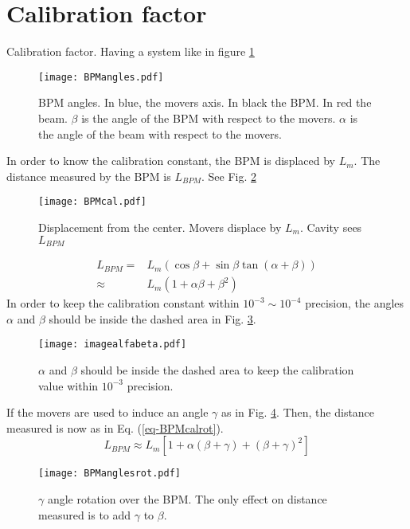 \section{Calibration factor}
Calibration factor. Having a system like in figure \ref{f-BPMangles}
\begin{figure}[htb]
 \begin{center}
  \texttt{[image: BPMangles.pdf]}\caption{BPM angles. In blue, the movers axis. In black the BPM. In red the beam. $\beta$ is the angle of the BPM with respect to the movers. $\alpha$ is the angle of the beam with respect to the movers.}\label{f-BPMangles}
 \end{center}
\end{figure}
In order to know the calibration constant, the BPM is displaced by $L_m$. The distance measured by the BPM is $L_{BPM}$. See Fig. \ref{f-BPMcal}
\begin{figure}[htb]
 \begin{center}
  \texttt{[image: BPMcal.pdf]}\caption{Displacement from the center. Movers displace by $L_m$. Cavity sees $L_{BPM}$}\label{f-BPMcal}
 \end{center}
\end{figure}
\begin{align*}
 L_{BPM}=&L_m\left(\cos\beta+\sin\beta\tan(\alpha+\beta)\right)\\
 \approx&L_m(1+\alpha\beta+\beta^2)\label{eq-BPMcal}
\end{align*}
In order to keep the calibration constant within $10^{-3}\sim10^{-4}$ precision, the angles $\alpha$ and $\beta$ should be inside the dashed area in Fig. \ref{f-imagealfabeta}.
\begin{figure}[htb]
 \begin{center}
  \texttt{[image: imagealfabeta.pdf]}\caption{$\alpha$ and $\beta$ should be inside the dashed area to keep the calibration value within $10^{-3}$ precision.}\label{f-imagealfabeta}
 \end{center}
\end{figure}
If the movers are used to induce an angle $\gamma$ as in Fig. \ref{f-BPManglesrot}. Then, the distance measured is now as in Eq. (\ref{eq-BPMcalrot}).
\begin{equation}
 L_{BPM}\approx L_m[1+\alpha(\beta+\gamma)+(\beta+\gamma)^2]\label{eq-BPMcalrot}
\end{equation}
\begin{figure}[htb]
 \begin{center}
  \texttt{[image: BPManglesrot.pdf]}\caption{$\gamma$ angle rotation over the BPM. The only effect on distance measured is to add $\gamma$ to $\beta$.}\label{f-BPManglesrot}
 \end{center}
\end{figure}
